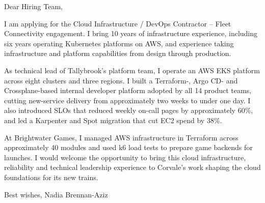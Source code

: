 \documentclass[11pt,a4paper]{article}
\begin{document}
Dear Hiring Team,

I am applying for the Cloud Infrastructure / DevOps Contractor – Fleet Connectivity engagement. I bring 10 years of infrastructure experience, including six years operating Kubernetes platforms on AWS, and experience taking infrastructure and platform capabilities from design through production.

As technical lead of Tallybrook’s platform team, I operate an AWS EKS platform across eight clusters and three regions. I built a Terraform-, Argo CD- and Crossplane-based internal developer platform adopted by all 14 product teams, cutting new-service delivery from approximately two weeks to under one day. I also introduced SLOs that reduced weekly on-call pages by approximately 60\%, and led a Karpenter and Spot migration that cut EC2 spend by 38\%.

At Brightwater Games, I managed AWS infrastructure in Terraform across approximately 40 modules and used k6 load tests to prepare game backends for launches. I would welcome the opportunity to bring this cloud infrastructure, reliability and technical leadership experience to Corvale’s work shaping the cloud foundations for its new trains.

Best wishes,
Nadia Brennan-Aziz
\end{document}
